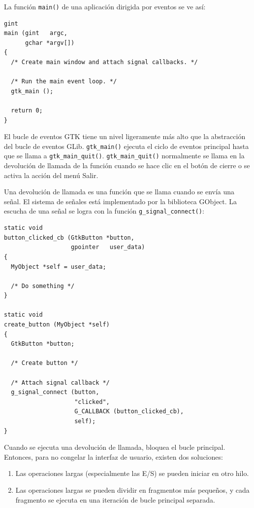 La función \lstinline{main()} de una aplicación dirigida por eventos se ve así:
\begin{lstlisting}
gint
main (gint   argc,
      gchar *argv[])
{
  /* Create main window and attach signal callbacks. */

  /* Run the main event loop. */
  gtk_main ();

  return 0;
}
\end{lstlisting}

El bucle de eventos GTK tiene un nivel ligeramente más alto que la abstracción del bucle de eventos GLib. \lstinline{gtk_main()} ejecuta el ciclo de eventos principal hasta que se llama a \lstinline{gtk_main_quit()}. \lstinline{gtk_main_quit()} normalmente se llama en la devolución de llamada de la función cuando se hace clic en el botón de cierre o se activa la acción del menú Salir.

Una devolución de llamada es una función que se llama cuando se envía una señal. El sistema de señales está implementado por la biblioteca GObject. La escucha de una señal se logra con la función \lstinline{g_signal_connect()}:
\begin{lstlisting}
static void
button_clicked_cb (GtkButton *button,
                   gpointer   user_data)
{
  MyObject *self = user_data;

  /* Do something */
}

static void
create_button (MyObject *self)
{
  GtkButton *button;

  /* Create button */

  /* Attach signal callback */
  g_signal_connect (button,
                    "clicked",
                    G_CALLBACK (button_clicked_cb),
                    self);
}
\end{lstlisting}

Cuando se ejecuta una devolución de llamada, bloquea el bucle principal. Entonces, para no congelar la interfaz de usuario, existen dos soluciones:
\begin{enumerate}
    \item Las operaciones largas (especialmente las E/S) se pueden iniciar en otro hilo.
    \item Las operaciones largas se pueden dividir en fragmentos más pequeños, y cada fragmento se ejecuta en una iteración de bucle principal separada.
\end{enumerate}

